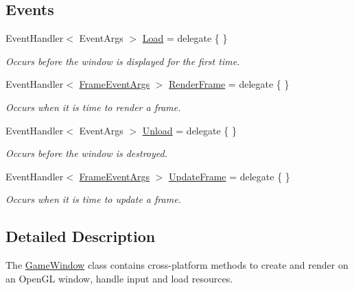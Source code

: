 \subsection*{Events}
\begin{DoxyCompactItemize}
\item 
Event\-Handler$<$ Event\-Args $>$ \hyperlink{class_open_t_k_1_1_game_window_a5d449a387cf4600251fc534fd49bdbc3}{Load} = delegate \{ \}
\begin{DoxyCompactList}\small\item\em Occurs before the window is displayed for the first time. \end{DoxyCompactList}\item 
Event\-Handler$<$ \hyperlink{class_open_t_k_1_1_frame_event_args}{Frame\-Event\-Args} $>$ \hyperlink{class_open_t_k_1_1_game_window_a299211a98496fdac0a526a353dd5f25a}{Render\-Frame} = delegate \{ \}
\begin{DoxyCompactList}\small\item\em Occurs when it is time to render a frame. \end{DoxyCompactList}\item 
Event\-Handler$<$ Event\-Args $>$ \hyperlink{class_open_t_k_1_1_game_window_a039f40ed67b4d0c64e292c7e9e77e80b}{Unload} = delegate \{ \}
\begin{DoxyCompactList}\small\item\em Occurs before the window is destroyed. \end{DoxyCompactList}\item 
Event\-Handler$<$ \hyperlink{class_open_t_k_1_1_frame_event_args}{Frame\-Event\-Args} $>$ \hyperlink{class_open_t_k_1_1_game_window_af3c171dd667a38eb461df532ff6cc016}{Update\-Frame} = delegate \{ \}
\begin{DoxyCompactList}\small\item\em Occurs when it is time to update a frame. \end{DoxyCompactList}\end{DoxyCompactItemize}


\subsection{Detailed Description}
The \hyperlink{class_open_t_k_1_1_game_window}{Game\-Window} class contains cross-\/platform methods to create and render on an Open\-G\-L window, handle input and load resources. 

